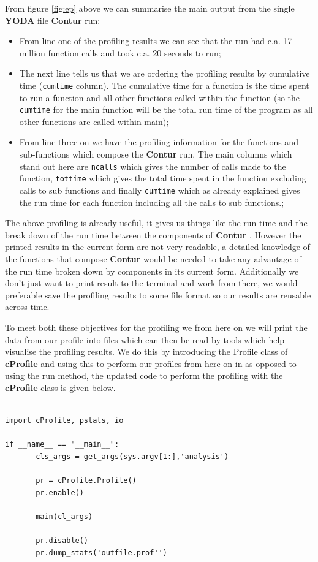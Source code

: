 From figure \ref{fig:ep} above we can summarise the main output from the single \textbf{YODA} file \textbf{Contur} run:

\begin{itemize}
\item From line one of the profiling results we can see that the run had c.a. 17 million function calls and took c.a. 20 seconds to run;
\item The next line tells us that we are ordering the profiling results by cumulative time (\texttt{cumtime} column). The cumulative time for a function is the time spent to run a function and all other functions called within the function (so the \texttt{cumtime} for the main function will be the total run time of the program as all other functions are called within main);
\item From line three on we have the profiling information for the functions and sub-functions which compose the \textbf{Contur}  run. The main columns which stand out here are \texttt{ncalls} which gives the number of calls made to the function, \texttt{tottime} which gives the total time spent in the function excluding calls to sub functions and finally \texttt{cumtime} which as already explained gives the run time for each function including all the calls to sub functions.;
\end{itemize}

The above profiling is already useful, it gives us things like the run time and the break down of the run time between the components of \textbf{Contur} . However the printed results in the current form are not very readable, a detailed knowledge of the functions that compose \textbf{Contur} would be needed to take any advantage of the run time broken down by components in its current form. Additionally we don't just want to print result to the terminal and work from there, we would preferable save the profiling results to some file format so our results are reusable across time. 

To meet both these objectives for the profiling we  from here on we will print the data from our profile into  files which can then be read by tools which help visualise the profiling results. We do this by introducing the Profile class of \textbf{cProfile} and using this to perform our profiles from here on in as opposed to using the run method, the updated code to perform the profiling with the \textbf{cProfile} class is given below.

\begin{verbatim}

import cProfile, pstats, io

if __name__ == "__main__":
       cls_args = get_args(sys.argv[1:],'analysis')
       
       pr = cProfile.Profile()
       pr.enable()
       
       main(cl_args)
       
       pr.disable()
       pr.dump_stats('outfile.prof'')
\end{verbatim}


